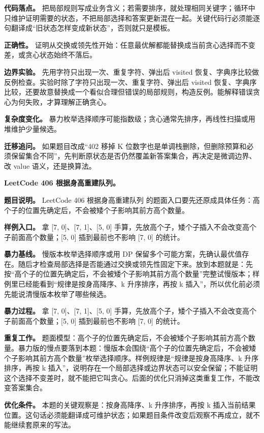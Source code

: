 \textbf{代码落点。} 把局部规则写成业务含义；若需要排序，就处理相同关键字；循环中只维护证明需要的状态，不把局部选择和答案更新混在一起。关键代码行必须能逐句翻译成“旧状态怎样变成新状态”，否则就只是模板。

\textbf{正确性。} 证明从交换或领先性开始：任意最优解都能替换成当前贪心选择而不变差，或贪心状态始终不落后。

\textbf{边界实验。} 先用字符只出现一次、重复字符、弹出后 visited 恢复、字典序比较做反例检查。实验时除了字符只出现一次、重复字符、弹出后 visited 恢复、字典序比较，还要故意替换成一个看似合理但错误的局部规则，构造反例。能解释错误贪心为何失败，才算理解正确贪心。

\textbf{复杂度变化。} 暴力枚举选择顺序可能指数级；贪心通常先排序，再线性扫描或用堆维护少量候选。

\textbf{迁移追问。} 如果题目改成“402 移掉 K 位数字也是单调栈删除，但删除预算和必须保留集合不同”，先判断原状态是否仍然覆盖新答案集合，再决定是微调边界、改 value 语义，还是换算法。

\noindent\textbf{LeetCode 406 根据身高重建队列。}

\textbf{题目说明。} LeetCode 406 根据身高重建队列 的题面入口要先还原成具体任务：高个子的位置先确定后，不会被矮个子影响其前方高个数量。

\textbf{样例入口。} 拿 [7, 0]、[7, 1]、[5, 0] 手算，先放高个子，矮个子插入不会改变高个子前面高个数量；[5, 0] 插到最前也不影响 [7, 0] 的统计。

\textbf{暴力基线。} 慢版本枚举选择顺序或用 DP 保留多个可能方案，先确认最优值存在。随后才检查局部选择是否能通过交换或领先性固定下来。放到本题就是：先按“高个子的位置先确定后，不会被矮个子影响其前方高个数量”完整试慢版本；样例里已经能看到“规律是按身高降序、k 升序排序，再按 k 插入”，所以优化前必须先能说清慢版本枚举了哪些候选。

\textbf{暴力过程。} 拿 [7, 0]、[7, 1]、[5, 0] 手算，先放高个子，矮个子插入不会改变高个子前面高个数量；[5, 0] 插到最前也不影响 [7, 0] 的统计。

\textbf{重复工作。} 题面模型：高个子的位置先确定后，不会被矮个子影响其前方高个数量。暴力版的慢点要落到本题：慢版本会围绕“高个子的位置先确定后，不会被矮个子影响其前方高个数量”枚举选择顺序。样例规律是“规律是按身高降序、k 升序排序，再按 k 插入”，说明存在一个局部选择或边界状态可以安全保留；不能证明这个选择不变差时，就不能把它叫贪心。后面的优化只消掉这类重复工作，不能改变答案集合。

\textbf{优化条件。} 本题的关键观察是：按身高降序、k 升序排序，再按 k 插入当前结果位置。这句话必须能翻译成可维护状态；如果题目条件改变后观察不再成立，就不能继续套原来的写法。

